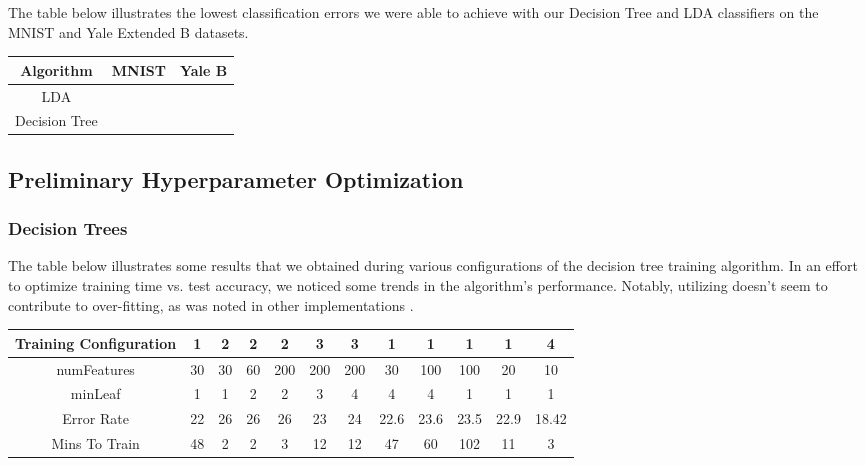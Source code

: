 
The table below illustrates the lowest classification errors we were able to achieve with our Decision Tree and LDA classifiers on the MNIST and Yale Extended B datasets. 

\begin{center}
 \begin{tabular}{||c | c | c||} 
   \hline
   Algorithm & MNIST & Yale B \\
   \hline\hline
   LDA &  &  \\ 
   \hline
   Decision Tree &  &  \\ 
   \hline
\end{tabular}
\end{center}

\subsection{Preliminary Hyperparameter Optimization}

\subsubsection{Decision Trees}

The table below illustrates some results that we obtained during various configurations of the decision tree training algorithm. In an effort to optimize training time vs. test accuracy, we noticed some trends in the algorithm's performance. Notably, utilizing  doesn't seem to contribute to over-fitting, as was noted in other implementations \cite{matlab:fitctree}. 


\begin{center}
 \begin{tabular}{||c | c | c | c | c | c | c | c | c | c | c | c||} 
   \hline
   Training Configuration & 1 & 2 & 2 & 2 & 3 & 3 & 1 & 1 & 1 & 1 & 4 \\
   \hline
   numFeatures & 30 & 30 & 60 & 200 & 200 & 200 & 30 & 100 & 100 &  20 & 10 \\
   \hline
   minLeaf & 1 & 1 & 2 & 2 & 3 & 4 & 4 & 4 & 1 & 1 & 1 \\
   \hline
   Error Rate & 22 & 26 & 26 & 26 & 23 & 24 & 22.6 & 23.6 & 23.5 & 22.9 & 18.42 \\
   \hline
   Mins To Train & 48 & 2 & 2 & 3 & 12 & 12 & 47 & 60 & 102 & 11 & 3 \\
   \hline
\end{tabular}
\end{center}


